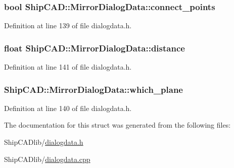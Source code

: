 \subsubsection[{\texorpdfstring{connect\+\_\+points}{connect_points}}]{\setlength{\rightskip}{0pt plus 5cm}bool Ship\+C\+A\+D\+::\+Mirror\+Dialog\+Data\+::connect\+\_\+points}\hypertarget{structShipCAD_1_1MirrorDialogData_a6e3cdbe59eeedec71b5d3b56e5414516}{}\label{structShipCAD_1_1MirrorDialogData_a6e3cdbe59eeedec71b5d3b56e5414516}


Definition at line 139 of file dialogdata.\+h.

\subsubsection[{\texorpdfstring{distance}{distance}}]{\setlength{\rightskip}{0pt plus 5cm}float Ship\+C\+A\+D\+::\+Mirror\+Dialog\+Data\+::distance}\hypertarget{structShipCAD_1_1MirrorDialogData_ab692a899cc809b67fd65fee10848e863}{}\label{structShipCAD_1_1MirrorDialogData_ab692a899cc809b67fd65fee10848e863}


Definition at line 141 of file dialogdata.\+h.

\subsubsection[{\texorpdfstring{which\+\_\+plane}{which_plane}}]{ Ship\+C\+A\+D\+::\+Mirror\+Dialog\+Data\+::which\+\_\+plane}\hypertarget{structShipCAD_1_1MirrorDialogData_a4e17198aa242bba6426a2b28840ceca5}{}\label{structShipCAD_1_1MirrorDialogData_a4e17198aa242bba6426a2b28840ceca5}


Definition at line 140 of file dialogdata.\+h.



The documentation for this struct was generated from the following files\+:\begin{DoxyCompactItemize}
\item 
Ship\+C\+A\+Dlib/\hyperlink{dialogdata_8h}{dialogdata.\+h}\item 
Ship\+C\+A\+Dlib/\hyperlink{dialogdata_8cpp}{dialogdata.\+cpp}\end{DoxyCompactItemize}
